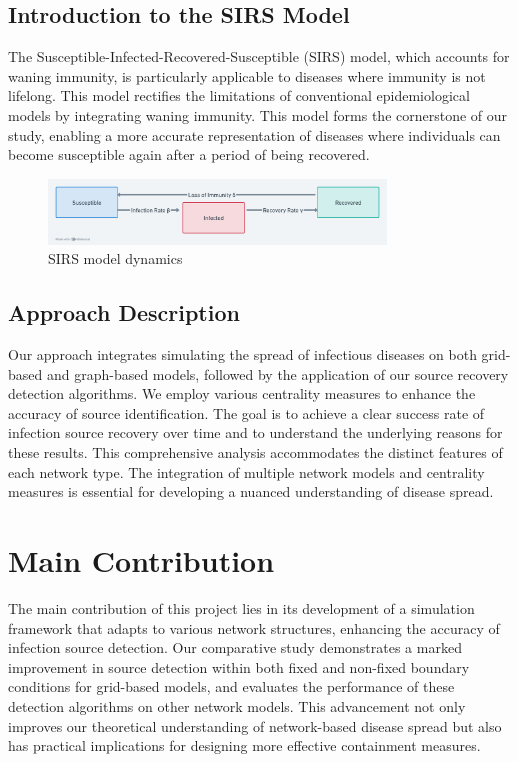 \subsection{Introduction to the SIRS Model}
The Susceptible-Infected-Recovered-Susceptible (SIRS) model, which accounts for waning immunity, is particularly applicable to diseases where immunity is not lifelong. This model rectifies the limitations of conventional epidemiological models by integrating waning immunity. This model forms the cornerstone of our study, enabling a more accurate representation of diseases where individuals can become susceptible again after a period of being recovered.

\begin{figure}[H]
    \centering
    \includegraphics[width=0.8\textwidth]{SIRS_Model_Dynamics.png}
    \caption{SIRS model dynamics}
    \label{fig:SIRS_Model_Dynamics}
\end{figure}

\subsection{Approach Description}
Our approach integrates simulating the spread of infectious diseases on both grid-based and graph-based models, followed by the application of our source recovery detection algorithms. We employ various centrality measures to enhance the accuracy of source identification. The goal is to achieve a clear success rate of infection source recovery over time and to understand the underlying reasons for these results. This comprehensive analysis accommodates the distinct features of each network type. The integration of multiple network models and centrality measures is essential for developing a nuanced understanding of disease spread.

\section{Main Contribution}
The main contribution of this project lies in its development of a simulation framework that adapts to various network structures, enhancing the accuracy of infection source detection. Our comparative study demonstrates a marked improvement in source detection within both fixed and non-fixed boundary conditions for grid-based models, and evaluates the performance of these detection algorithms on other network models. This advancement not only improves our theoretical understanding of network-based disease spread but also has practical implications for designing more effective containment measures.

